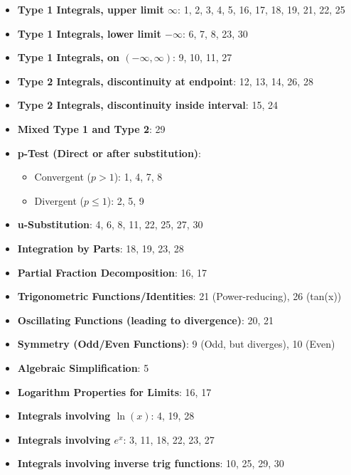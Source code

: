 \documentclass{article}
\begin{document}
\begin{itemize}
    \item \textbf{Type 1 Integrals, upper limit $\infty$}: 1, 2, 3, 4, 5, 16, 17, 18, 19, 21, 22, 25
    \item \textbf{Type 1 Integrals, lower limit $-\infty$}: 6, 7, 8, 23, 30
    \item \textbf{Type 1 Integrals, on $(-\infty, \infty)$}: 9, 10, 11, 27
    \item \textbf{Type 2 Integrals, discontinuity at endpoint}: 12, 13, 14, 26, 28
    \item \textbf{Type 2 Integrals, discontinuity inside interval}: 15, 24
    \item \textbf{Mixed Type 1 and Type 2}: 29
    \item \textbf{p-Test (Direct or after substitution)}:
    	\begin{itemize}
    		\item Convergent ($p > 1$): 1, 4, 7, 8
    		\item Divergent ($p \le 1$): 2, 5, 9
    	\end{itemize}
    \item \textbf{u-Substitution}: 4, 6, 8, 11, 22, 25, 27, 30
    \item \textbf{Integration by Parts}: 18, 19, 23, 28
    \item \textbf{Partial Fraction Decomposition}: 16, 17
    \item \textbf{Trigonometric Functions/Identities}: 21 (Power-reducing), 26 (tan(x))
    \item \textbf{Oscillating Functions (leading to divergence)}: 20, 21
    \item \textbf{Symmetry (Odd/Even Functions)}: 9 (Odd, but diverges), 10 (Even)
    \item \textbf{Algebraic Simplification}: 5
    \item \textbf{Logarithm Properties for Limits}: 16, 17
    \item \textbf{Integrals involving $\ln(x)$}: 4, 19, 28
    \item \textbf{Integrals involving $e^x$}: 3, 11, 18, 22, 23, 27
    \item \textbf{Integrals involving inverse trig functions}: 10, 25, 29, 30
\end{itemize}
\end{document}

